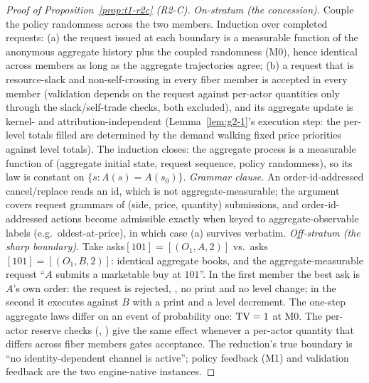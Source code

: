 
\begin{proof}[Proof of Proposition~\ref{prop:t1-r2c} (R2-C)]
\emph{On-stratum (the concession).} Couple the policy randomness across the
two members. Induction over completed requests: (a) the request issued at
each boundary is a measurable function of the anonymous aggregate history
plus the coupled randomness (M0), hence identical across members as long
as the aggregate trajectories agree; (b) a request that is
resource-slack and non-self-crossing in every fiber member is accepted in
every member (validation depends on the request against per-actor
quantities only through the slack/self-trade checks, both excluded), and
its aggregate update is kernel- and attribution-independent
(Lemma~\ref{lem:g2-1}'s execution step: the per-level totals filled are
determined by the demand walking fixed price priorities against level
totals). The induction closes: the aggregate process is a measurable
function of (aggregate initial state, request sequence, policy
randomness), so its law is constant on $\{s : A(s) = A(s_0)\}$.
\emph{Grammar clause.} An order-id-addressed cancel/replace reads an id,
which is not aggregate-measurable; the argument covers request grammars of
(side, price, quantity) submissions, and order-id-addressed actions become
admissible exactly when keyed to aggregate-observable labels
(e.g.\ oldest-at-price), in which case (a) survives verbatim.
\emph{Off-stratum (the sharp boundary).} Take
asks$[101] = [(O_1, A, 2)]$ vs.\ asks$[101] = [(O_1, B, 2)]$: identical
aggregate books, and the aggregate-measurable request ``$A$ submits a
marketable buy at $101$''. In the first member the best ask is $A$'s own
order: the request is rejected, , no print and
no level change; in the second it executes against $B$ with a print and a
level decrement. The one-step aggregate laws differ on an event of
probability one: $\operatorname{TV} = 1$ at M0. The per-actor reserve checks
(, ) give the same
effect whenever a per-actor quantity that differs across fiber members
gates acceptance. The reduction's true boundary is ``no identity-dependent
channel is active''; policy feedback (M1) and validation feedback are the
two engine-native instances.
\end{proof}

